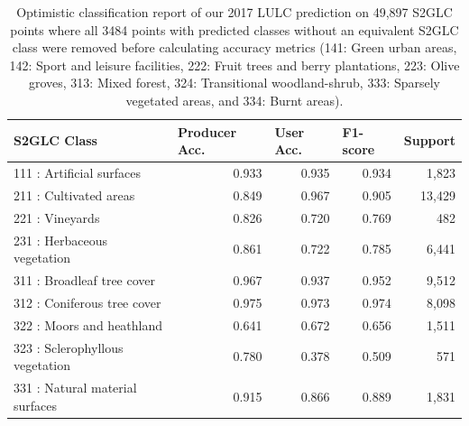         \begin{table}[!hbt]
        \centering
        \caption{Optimistic classification report of our 2017 LULC prediction on 49,897 S2GLC points where all 3484 points with predicted classes without an equivalent S2GLC class were removed before calculating accuracy metrics (141: Green urban areas, 142: Sport and leisure facilities, 222: Fruit trees and berry plantations, 223: Olive groves, 313: Mixed forest, 324: Transitional woodland-shrub, 333: Sparsely vegetated areas, and 334: Burnt areas).}
        \label{tab:classification_report_s2glc_optimistic}
        \begin{tabular}{@{}lrrrr@{}}
        \toprule
        S2GLC Class                      & \multicolumn{1}{l}{Producer Acc.} & \multicolumn{1}{l}{User Acc.} & \multicolumn{1}{l}{F1-score} & \multicolumn{1}{l}{Support} \\
        \midrule
        111 : Artificial surfaces       & 0.933                             & 0.935                         & 0.934                        & 1,823                    \\
        211 : Cultivated areas          & 0.849                             & 0.967                         & 0.905                        & 13,429                   \\
        221 : Vineyards                 & 0.826                             & 0.720                         & 0.769                        & 482                     \\
        231 : Herbaceous vegetation     & 0.861                             & 0.722                         & 0.785                        & 6,441                    \\
        311 : Broadleaf tree cover      & 0.967                             & 0.937                         & 0.952                        & 9,512                    \\
        312 : Coniferous tree cover     & 0.975                             & 0.973                         & 0.974                        & 8,098                    \\
        322 : Moors and heathland       & 0.641                             & 0.672                         & 0.656                        & 1,511                    \\
        323 : Sclerophyllous vegetation & 0.780                             & 0.378                         & 0.509                        & 571                     \\
        331 : Natural material surfaces & 0.915                             & 0.866                         & 0.889                        & 1,831                    \\

\end{tabular}
\end{table}
